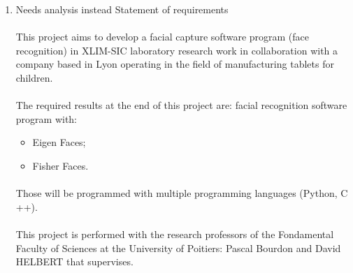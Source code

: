 \begin{enumerate}
	\item Needs analysis instead Statement of requirements\paragraph{}
This project aims to develop a facial capture software program (face recognition) in XLIM-SIC laboratory research work in collaboration with a company based in Lyon operating in the field of manufacturing tablets for children.\paragraph{}
The required results at the end of this project are: facial recognition software program with:
\begin{itemize}
	\item Eigen Faces;
	\item Fisher Faces.\paragraph{}
\end{itemize}

Those will be programmed with multiple programming languages (Python, C ++).\paragraph{}
This project is performed with the research professors of the Fondamental Faculty of  Sciences at the University of Poitiers: Pascal Bourdon and David HELBERT that supervises.\vspace{0.5cm}

\end{enumerate}

